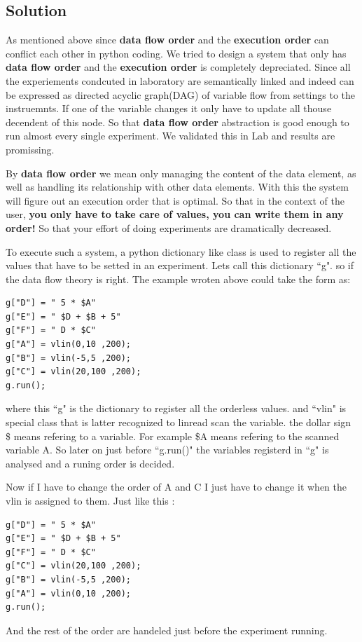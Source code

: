 \documentclass{article}
\begin{document}
\subsection{Solution}
As mentioned above since  {\bf data flow order} and the {\bf execution order} 
	can conflict each other in python coding. 
We tried to design a system that only has {\bf data flow order} and the 
	{\bf execution order} is completely depreciated.
Since all the experiements condcuted in laboratory are semantically linked and
	indeed can be expressed as directed acyclic graph(DAG) of variable flow from
	settings to the instruemnts.
If one of the variable changes it only have to update all thouse decendent of this node. So that {\bf data flow order} abstraction is good enough to run almost every single experiment. We validated this in Lab and results are promissing.

By {\bf data flow order} we mean only managing the content of the data element, 
	as well as handling its relationship with other data elements. 
With this the system will figure out an execution order that is optimal. 
So that in the context of the user, 
	{\bf you only have to take care of values, you can write them in any order!}
So that your effort of doing experiments are dramatically decreased.

To execute such a system, a python dictionary like class is used to register all the values that have to be setted in an experiment. 
Lets call this dictionary ``g". so if the data flow theory is right. The example
wroten above could take the form as:

\begin{lstlisting}
g["D"] = " 5 * $A" 
g["E"] = " $D + $B + 5" 
g["F"] = " D * $C" 
g["A"] = vlin(0,10 ,200);
g["B"] = vlin(-5,5 ,200);
g["C"] = vlin(20,100 ,200);
g.run();
\end{lstlisting}

where this ``g" is the dictionary to register all the orderless values.
and ``vlin" is  special class that is latter recognized to linread scan the variable.
the dollar sign \$ means refering to a variable.
For example \$A means refering to the scanned variable A.
So later on just before ``g.run()" the variables registerd in ``g"
	is analysed and a runing order is decided.

Now if I have to change the order of A and C I just have to change it when the 
	vlin is assigned to them. Just like this : 

\begin{lstlisting}
g["D"] = " 5 * $A" 
g["E"] = " $D + $B + 5" 
g["F"] = " D * $C" 
g["C"] = vlin(20,100 ,200);
g["B"] = vlin(-5,5 ,200);
g["A"] = vlin(0,10 ,200);
g.run();
\end{lstlisting}
And the rest of the order are handeled just before the experiment running.
\end{document}
